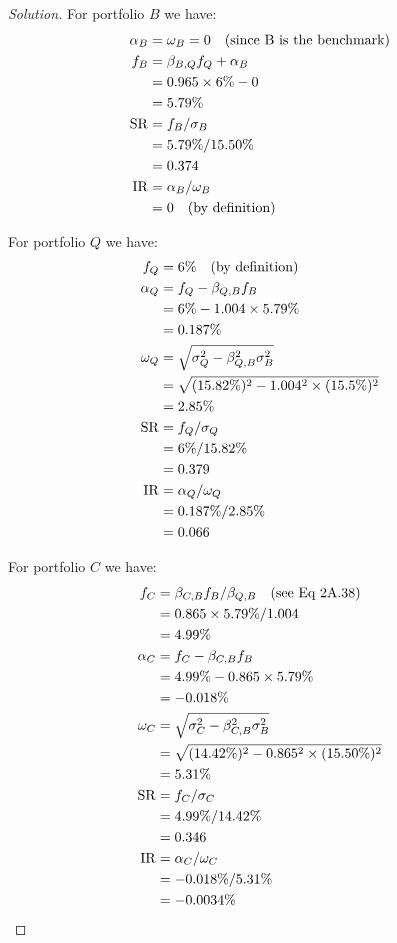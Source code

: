 \begin{proof}[Solution]
  For portfolio $B$ we have:
  \begin{align*}
   \alpha_{B} &= \omega_{B} = 0 \text{\quad(since B is the benchmark)} \\
   f_{B}&=\beta_{B,Q}f_{Q} + \alpha_{B}\\
        &= 0.965\times6\% -0 \\
        &= 5.79\% \\
   \mathrm{SR} &= f_{B}/\sigma_{B}\\
	       &= 5.79\%/15.50\% \\
	       &=0.374\\
   \mathrm{IR} &= \alpha_{B}/\omega_{B} \\
	       &= 0 \text{\quad(by definition)}
  \end{align*}

  
  For portfolio $Q$ we have:
  \begin{align*}
   f_{Q}&= 6\%\text{\quad(by definition)}\\
   \alpha_{Q} &= f_{Q} - \beta_{Q,B}f_{B} \\
	      &= 6\% - 1.004\times5.79\% \\
	      &= 0.187\%\\
   \omega_{Q} &= \sqrt{\sigma_{Q}^{2}-\beta_{Q,B}^{2}\sigma_{B}^{2}}\\
	      &= \sqrt{(15.82\%)^{2} -1.004^{2}\times(15.5\%)^{2}}\\
	      &= 2.85\%\\
   \mathrm{SR} &= f_{Q}/\sigma_{Q} \\
	       &= 6\%/15.82\%\\ 
	       &=0.379\\
   \mathrm{IR} &= \alpha_{Q}/\omega_{Q}\\
	       &= 0.187\%/2.85\%\\
	       &= 0.066
  \end{align*}
  
  For portfolio $C$ we have:
  \begin{align*}
   f_{C} &= \beta_{C,B}f_{B}/\beta_{Q,B} \text{\quad (see Eq 2A.38)}\\
	 &= 0.865\times 5.79\% / 1.004 \\
	 &= 4.99\%\\
   \alpha_{C} &= f_{C} - \beta_{C,B}f_{B} \\
	      &= 4.99\% - 0.865\times5.79\% \\
	      &= -0.018\%\\
   \omega_{C} &= \sqrt{\sigma_{C}^{2}-\beta_{C,B}^{2}\sigma_{B}^{2}}\\
	      &= \sqrt{(14.42\%)^{2} -0.865^{2}\times(15.50\%)^{2}}\\
	      &= 5.31\%\\
   \mathrm{SR} &= f_{C}/\sigma_{C} \\
	       &= 4.99\%/14.42\%\\ 
	       &=0.346\\
   \mathrm{IR} &= \alpha_{C}/\omega_{C}\\
	       &= -0.018\%/5.31\%\\
	       &= -0.0034\%
  \end{align*}
\end{proof}


